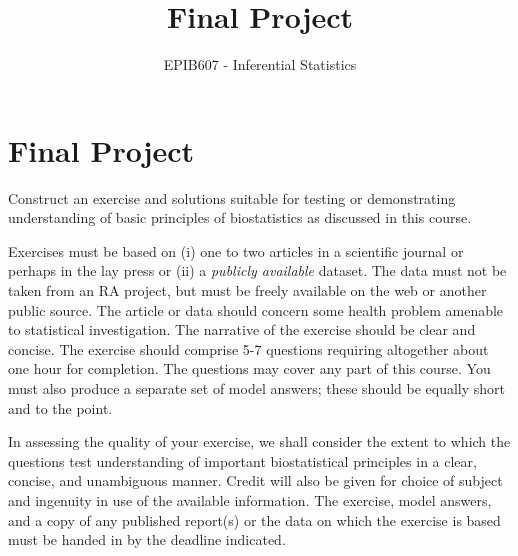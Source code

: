 \documentclass[letterpaper,12pt,twoside,printwatermark=false]{pinp}
\title{Final Project}
\author[a]{EPIB607 - Inferential Statistics}
\affil[a]{Fall 2018, McGill University}
\begin{document}
\verticaladjustment{-2pt}

\maketitle
\thispagestyle{firststyle}



\section{Final Project}\label{final-project}

Construct an exercise and solutions suitable for testing or
demonstrating understanding of basic principles of biostatistics as
discussed in this course.

\vspace*{.3in}

Exercises must be based on (i) one to two articles in a scientific
journal or perhaps in the lay press or (ii) a
\textit{publicly available} dataset. The data must not be taken from an
RA project, but must be freely available on the web or another public
source. The article or data should concern some health problem amenable
to statistical investigation. The narrative of the exercise should be
clear and concise. The exercise should comprise 5-7 questions requiring
altogether about one hour for completion. The questions may cover any
part of this course. You must also produce a separate set of model
answers; these should be equally short and to the point.

\vspace*{.3in}

In assessing the quality of your exercise, we shall consider the extent
to which the questions test understanding of important biostatistical
principles in a clear, concise, and unambiguous manner. Credit will also
be given for choice of subject and ingenuity in use of the available
information. The exercise, model answers, and a copy of any published
report(s) or the data on which the exercise is based must be handed in
by the deadline indicated.
\end{document}
